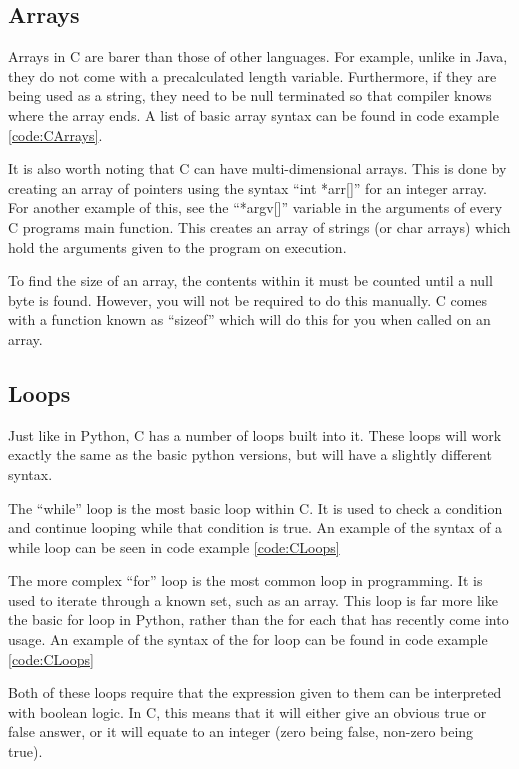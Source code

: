 \documentclass[a4paper,11pt]{report}
\begin{document}
		\subsection{Arrays}
			Arrays in C are barer than those of other languages. 
			For example, unlike in Java, they do not come with a precalculated length variable.
			Furthermore, if they are being used as a string, they need to be null terminated so that compiler knows where the array ends. 
			A list of basic array syntax can be found in code example \ref{code:CArrays}.
			\begin{code}
				C}]{./arrays.c}
				\caption{A List of Different Array Syntax}
				\label{code:CArrays}
			\end{code}
			It is also worth noting that C can have multi-dimensional arrays. 
			This is done by creating an array of pointers using the syntax ``int *arr[]'' for an integer array. 
			For another example of this, see the ``*argv[]'' variable in the arguments of every C programs main function. 
			This creates an array of strings (or char arrays) which hold the arguments given to the program on execution. 

			To find the size of an array, the contents within it must be counted until a null byte is found. 
			However, you will not be required to do this manually. 
			C comes with a function known as ``sizeof'' which will do this for you when called on an array. 
		\subsection{Loops}
			Just like in Python, C has a number of loops built into it. 
			These loops will work exactly the same as the basic python versions, but will have a slightly different syntax. 
			
			The ``while'' loop is the most basic loop within C. 
			It is used to check a condition and continue looping while that condition is true. 
			An example of the syntax of a while loop can be seen in code example \ref{code:CLoops}

			The more complex ``for'' loop is the most common loop in programming. 
			It is used to iterate through a known set, such as an array. 
			This loop is far more like the basic for loop in Python, rather than the for each that has recently come into usage. 
			An example of the syntax of the for loop can be found in code example \ref{code:CLoops}
			
			Both of these loops require that the expression given to them can be interpreted with boolean logic. 
			In C, this means that it will either give an obvious true or false answer, or it will equate to an integer (zero being false, non-zero being true).
\end{document}
